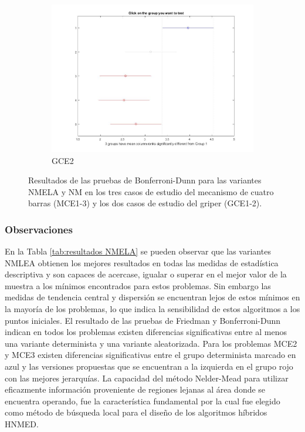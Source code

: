 \begin{figure}
\begin{subfigure}[b]{0.49\linewidth}
		\includegraphics[width=\linewidth]{Figures/NMELA_FB_P5}
		\caption{GCE2} \label{fig:M4} 
	\end{subfigure}
	\caption{Resultados de las pruebas de Bonferroni-Dunn para las variantes NMELA y NM en los tres casos de estudio del mecanismo de cuatro barras (MCE1-3) y los dos casos de estudio del griper (GCE1-2).} \label{fig: Bonferroni-Dunn -NMELA} 
	
\end{figure}
\subsubsection{Observaciones}
En la Tabla \ref{tab:resultados NMELA} se pueden observar que las variantes NMLEA obtienen los mejores resultados en todas las medidas de estadística descriptiva y son capaces de acercase, igualar o superar en el mejor valor de la muestra a los mínimos encontrados para estos problemas. Sin embargo las medidas de tendencia central y dispersión  se encuentran lejos de estos mínimos en la mayoría de los problemas, lo que indica la sensibilidad de estos algoritmos a los puntos iniciales. El resultado de las pruebas de Friedman y Bonferroni-Dunn indican en  todos los problemas existen diferencias significativas entre al menos una variante determinista y una variante aleatorizada. Para los problemas MCE2 y MCE3 existen diferencias significativas entre el grupo determinista marcado en azul y las versiones propuestas que se encuentran a la izquierda en el grupo rojo con las mejores jerarquías. La capacidad del método Nelder-Mead para utilizar eficazmente información proveniente de regiones lejanas al área donde se encuentra operando, fue la característica fundamental por la cual fue elegido como método de búsqueda local para el diseño de los algoritmos híbridos HNMED. 



